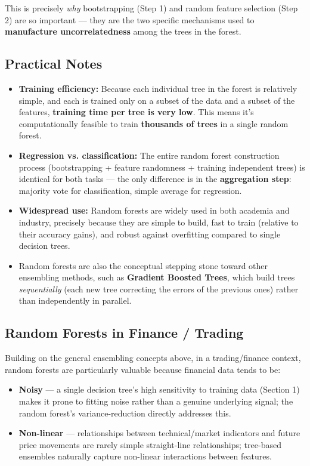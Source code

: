 \documentclass[12pt,openany]{book}
\begin{document}
This is precisely \textit{why} bootstrapping (Step 1) and random feature selection (Step 2) are so important --- they are the two specific mechanisms used to \textbf{manufacture uncorrelatedness} among the trees in the forest.

\medskip


\subsection{Practical Notes}


\begin{itemize}[leftmargin=*]
    \item \textbf{Training efficiency:} Because each individual tree in the forest is relatively simple, and each is trained only on a subset of the data and a subset of the features, \textbf{training time per tree is very low}. This means it's computationally feasible to train \textbf{thousands of trees} in a single random forest.
    \item \textbf{Regression vs. classification:} The entire random forest construction process (bootstrapping + feature randomness + training independent trees) is identical for both tasks --- the only difference is in the \textbf{aggregation step}: majority vote for classification, simple average for regression.
    \item \textbf{Widespread use:} Random forests are widely used in both academia and industry, precisely because they are simple to build, fast to train (relative to their accuracy gains), and robust against overfitting compared to single decision trees.
    \item Random forests are also the conceptual stepping stone toward other ensembling methods, such as \textbf{Gradient Boosted Trees}, which build trees \textit{sequentially} (each new tree correcting the errors of the previous ones) rather than independently in parallel.
\end{itemize}


\medskip


\subsection{Random Forests in Finance / Trading}


Building on the general ensembling concepts above, in a trading/finance context, random forests are particularly valuable because financial data tends to be:

\begin{itemize}[leftmargin=*]
    \item \textbf{Noisy} --- a single decision tree's high sensitivity to training data (Section 1) makes it prone to fitting noise rather than a genuine underlying signal; the random forest's variance-reduction directly addresses this.
    \item \textbf{Non-linear} --- relationships between technical/market indicators and future price movements are rarely simple straight-line relationships; tree-based ensembles naturally capture non-linear interactions between features.

\end{itemize}
\end{document}

